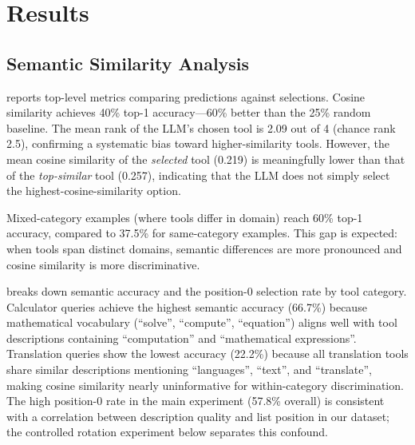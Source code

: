 \section{Results}
\label{sec:results}

\subsection{Semantic Similarity Analysis}
\label{sec:res_semantic}

 reports top-level metrics comparing \semsim predictions
against \gptmini selections.  Cosine similarity achieves 40\% top-1 accuracy---60\%
better than the 25\% random baseline.  The mean rank of the LLM's chosen tool is 2.09
out of 4 (chance rank 2.5), confirming a systematic bias toward higher-similarity tools.
However, the mean cosine similarity of the \emph{selected} tool (0.219) is meaningfully
lower than that of the \emph{top-similar} tool (0.257), indicating that the LLM does not
simply select the highest-cosine-similarity option.

Mixed-category examples (where tools differ in domain) reach 60\% top-1 accuracy,
compared to 37.5\% for same-category examples.  This gap is expected: when tools span
distinct domains, semantic differences are more pronounced and cosine similarity is more
discriminative.

   breaks down semantic accuracy
and the position-0 selection rate by tool category.  Calculator queries achieve the
highest semantic accuracy (66.7\%) because mathematical vocabulary (``solve'', ``compute'',
``equation'') aligns well with tool descriptions containing ``computation'' and
``mathematical expressions''.  Translation queries show the lowest accuracy (22.2\%)
because all translation tools share similar descriptions mentioning ``languages'', ``text'',
and ``translate'', making cosine similarity nearly uninformative for within-category
discrimination.  The high position-0 rate in the main experiment (57.8\% overall) is
consistent with a correlation between description quality and list position in our
dataset; the controlled rotation experiment below separates this confound.

